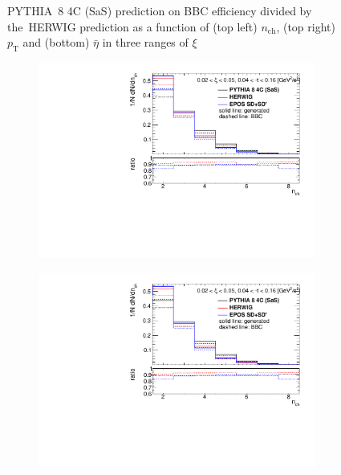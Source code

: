 \begin{figure}[t!]
\begin{subfigure}{.45\textwidth}
	\end{subfigure}
	\begin{minipage}{.45\textwidth}
		\caption{PYTHIA~8 4C (SaS) prediction on BBC efficiency  divided by the~HERWIG prediction as a function of (top left) $n_\textrm{ch}$, (top right) $p_\textrm{T}$ and (bottom)  $\bar{\eta}$ in three ranges of $\xi$}
		\label{fig:bbcCorection_syst}
	\end{minipage}
	
\end{figure}

\begin{figure}[t!]
	\centering
	\begin{subfigure}{.45\textwidth}
		\includegraphics[width=\textwidth,page=5]{chapters/chrgSTAR/img/bbcCorrection/xi_bbc.pdf}
	\end{subfigure}
	\begin{subfigure}{.45\textwidth}
		\includegraphics[width=\textwidth,page=10]{chapters/chrgSTAR/img/bbcCorrection/xi_bbc.pdf}

\end{subfigure}
\end{figure}
